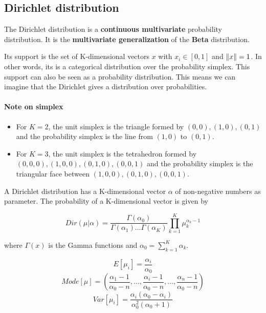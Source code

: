\subsection{Dirichlet distribution}

The Dirichlet distribution is a \textbf{continuous multivariate} probability distribution. It is the \textbf{multivariate generalization} of the \textbf{Beta} distribution.

Its support is the set of K-dimensional vectors $x$ with $x_i \in [0, 1]$ and $\left\lVert x\right\rVert = 1$. In other words, its is a categorical distribution over the probability simplex.
This support can also be seen as a probability distribution. This means we can imagine that the Dirichlet gives a distribution over probabilities.

\noindent\makebox[\linewidth]{\rule{\paperwidth}{0.4pt}}
\paragraph{Note on simplex}
\begin{itemize}
    \item For $K=2$, the unit simplex is the triangle formed by $(0, 0), (1, 0), (0, 1)$ and the probability simplex is the line from $(1, 0)$ to $(0, 1)$.
    \item For $K=3$, the unit simplex is the tetrahedron formed by $(0, 0, 0), (1, 0, 0), (0, 1, 0), (0, 0, 1)$ and the probability simplex is the triangular face between $(1, 0, 0), (0, 1, 0), (0, 0, 1)$.
\end{itemize}
\noindent\makebox[\linewidth]{\rule{\paperwidth}{0.4pt}}


A Dirichlet distribution has a K-dimensional vector $\alpha$ of non-negative numbers as parameter. The probability of a K-dimensional vector is given by


\begin{equation}
    Dir(\mu|\alpha) = \frac{\Gamma(\alpha_0)}{\Gamma(\alpha_1) \hdots \Gamma(\alpha_K)} \prod_{k=1}^K \mu_k^{\alpha_k-1}
\end{equation}


where $\Gamma(x)$ is the Gamma functions and $\alpha_0 = \sum_{k=1}^K \alpha_k$.

\begin{equation}
    E[\mu_i] = \frac{\alpha_i}{\alpha_0}
\end{equation}
\begin{equation}
    Mode[\mu] = \left( \frac{\alpha_1-1}{\alpha_0-n}, \dots, \frac{\alpha_i-1}{\alpha_0-n},  \dots, \frac{\alpha_n-1}{\alpha_0-n}  \right)
\end{equation}
\begin{equation}
    Var[\mu_i] = \frac{\alpha_i(\alpha_0-\alpha_i)}{\alpha_0^2(\alpha_0+1)}
\end{equation}

